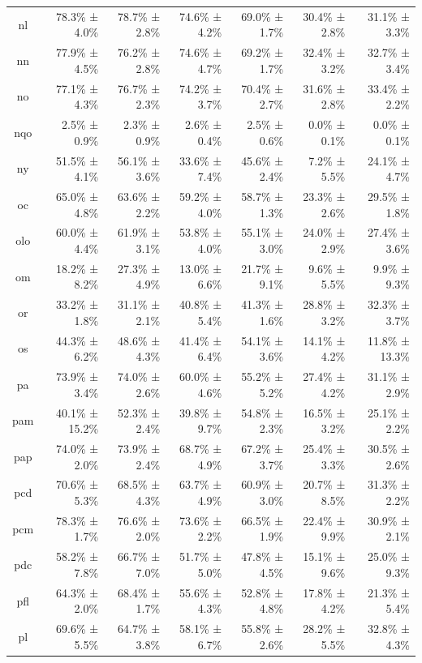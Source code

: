 \documentclass[10pt, a4paper]{article}
\begin{document}
\begin{table}[h]
\begin{tabular}{crrrrrr}
nl & 78.3\% ± 4.0\% & 78.7\% ± 2.8\% & 74.6\% ± 4.2\% & 69.0\% ± 1.7\% & 30.4\% ± 2.8\% & 31.1\% ± 3.3\% \\
nn & 77.9\% ± 4.5\% & 76.2\% ± 2.8\% & 74.6\% ± 4.7\% & 69.2\% ± 1.7\% & 32.4\% ± 3.2\% & 32.7\% ± 3.4\% \\
no & 77.1\% ± 4.3\% & 76.7\% ± 2.3\% & 74.2\% ± 3.7\% & 70.4\% ± 2.7\% & 31.6\% ± 2.8\% & 33.4\% ± 2.2\% \\
nqo & 2.5\% ± 0.9\% & 2.3\% ± 0.9\% & 2.6\% ± 0.4\% & 2.5\% ± 0.6\% & 0.0\% ± 0.1\% & 0.0\% ± 0.1\% \\
ny & 51.5\% ± 4.1\% & 56.1\% ± 3.6\% & 33.6\% ± 7.4\% & 45.6\% ± 2.4\% & 7.2\% ± 5.5\% & 24.1\% ± 4.7\% \\
oc & 65.0\% ± 4.8\% & 63.6\% ± 2.2\% & 59.2\% ± 4.0\% & 58.7\% ± 1.3\% & 23.3\% ± 2.6\% & 29.5\% ± 1.8\% \\
olo & 60.0\% ± 4.4\% & 61.9\% ± 3.1\% & 53.8\% ± 4.0\% & 55.1\% ± 3.0\% & 24.0\% ± 2.9\% & 27.4\% ± 3.6\% \\
om & 18.2\% ± 8.2\% & 27.3\% ± 4.9\% & 13.0\% ± 6.6\% & 21.7\% ± 9.1\% & 9.6\% ± 5.5\% & 9.9\% ± 9.3\% \\
or & 33.2\% ± 1.8\% & 31.1\% ± 2.1\% & 40.8\% ± 5.4\% & 41.3\% ± 1.6\% & 28.8\% ± 3.2\% & 32.3\% ± 3.7\% \\
os & 44.3\% ± 6.2\% & 48.6\% ± 4.3\% & 41.4\% ± 6.4\% & 54.1\% ± 3.6\% & 14.1\% ± 4.2\% & 11.8\% ± 13.3\% \\
pa & 73.9\% ± 3.4\% & 74.0\% ± 2.6\% & 60.0\% ± 4.6\% & 55.2\% ± 5.2\% & 27.4\% ± 4.2\% & 31.1\% ± 2.9\% \\
pam & 40.1\% ± 15.2\% & 52.3\% ± 2.4\% & 39.8\% ± 9.7\% & 54.8\% ± 2.3\% & 16.5\% ± 3.2\% & 25.1\% ± 2.2\% \\
pap & 74.0\% ± 2.0\% & 73.9\% ± 2.4\% & 68.7\% ± 4.9\% & 67.2\% ± 3.7\% & 25.4\% ± 3.3\% & 30.5\% ± 2.6\% \\
pcd & 70.6\% ± 5.3\% & 68.5\% ± 4.3\% & 63.7\% ± 4.9\% & 60.9\% ± 3.0\% & 20.7\% ± 8.5\% & 31.3\% ± 2.2\% \\
pcm & 78.3\% ± 1.7\% & 76.6\% ± 2.0\% & 73.6\% ± 2.2\% & 66.5\% ± 1.9\% & 22.4\% ± 9.9\% & 30.9\% ± 2.1\% \\
pdc & 58.2\% ± 7.8\% & 66.7\% ± 7.0\% & 51.7\% ± 5.0\% & 47.8\% ± 4.5\% & 15.1\% ± 9.6\% & 25.0\% ± 9.3\% \\
pfl & 64.3\% ± 2.0\% & 68.4\% ± 1.7\% & 55.6\% ± 4.3\% & 52.8\% ± 4.8\% & 17.8\% ± 4.2\% & 21.3\% ± 5.4\% \\
pl & 69.6\% ± 5.5\% & 64.7\% ± 3.8\% & 58.1\% ± 6.7\% & 55.8\% ± 2.6\% & 28.2\% ± 5.5\% & 32.8\% ± 4.3\% \\

\end{tabular}
\end{table}
\end{document}
